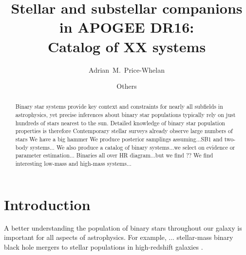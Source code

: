 \documentclass[modern]{aastex62}
\begin{document}
\title{Stellar and substellar companions in APOGEE DR16: \\
       Catalog of XX systems}

\author[0000-0003-0872-7098]{Adrian~M.~Price-Whelan}



\author{Others}

\begin{abstract}
Binary star systems provide key context and constraints for nearly all subfields in astrophysics, yet precise inferences about binary star populations typically rely on just hundreds of stars nearest to the sun.
Detailed knowledge of binary star population properties is therefore
Contemporary stellar surveys already observe large numbers of stars
We have a big hammer
We produce posterior samplings assuming...SB1 and two-body systems...
We also produce a catalog of binary systems...we select on evidence or parameter estimation...
Binaries all over HR diagram...but we find ??
We find interesting low-mass and high-mass systems...
\end{abstract}

\keywords{}


\section{Introduction} \label{sec:intro}

A better understanding the population of binary stars throughout our galaxy is important for all aspects of astrophysics. For example, ... stellar-mass binary black hole mergers to stellar populations in high-redshift galaxies \citep[e.g.,][]{Breivik:2019, Rix:2019}.
\end{document}
